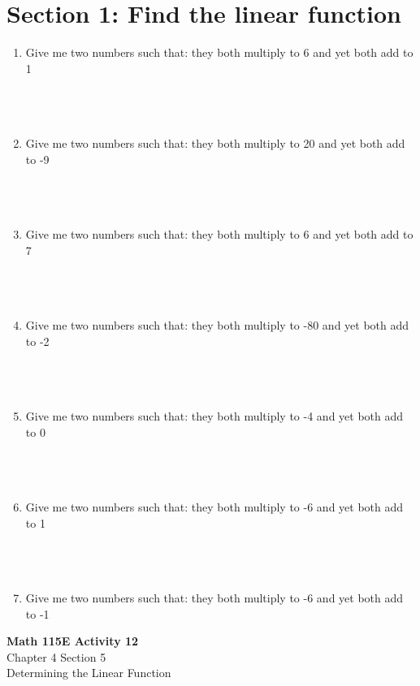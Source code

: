 \documentclass[12pt]{article}
\begin{document}
\section*{Section 1: Find the linear function}
    \begin{enumerate}[\#1]
        \item Give me two numbers such that: 
        they both multiply to 6 and yet both add to 1
        \\\\\\\\
        \item Give me two numbers such that: 
        they both multiply to 20 and yet both add to -9
        \\\\\\\\
        \item Give me two numbers such that: 
        they both multiply to 6 and yet both add to 7
        \\\\\\\\
        \item Give me two numbers such that: 
        they both multiply to -80 and yet both add to -2
        \\\\\\\\
        \item Give me two numbers such that: 
        they both multiply to -4 and yet both add to 0
        \\\\\\\\
        \item Give me two numbers such that: 
        they both multiply to -6 and yet both add to 1
        \\\\\\\\
        \item Give me two numbers such that: 
        they both multiply to -6 and yet both add to -1

    \end{enumerate}


\vspace{10cm}

\begin{center}
    \Large \textbf{Math 115E Activity 12} \\
    \vspace{0.2cm}
    \normalsize Chapter 4 Section 5 \\
    \normalsize Determining the Linear Function
\end{center}
\end{document}

